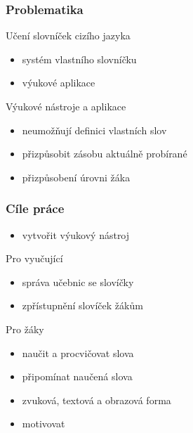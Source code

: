 \begin{frame}[t]
    \frametitle{Problematika}
    \begin{block}{Učení slovníček cizího jazyka}
    \begin{itemize}[<+->]
        \item systém vlastního slovníčku
        \item výukové aplikace
    \end{itemize}
    \end{block}
    
    \begin{block}{Výukové nástroje a aplikace}
    \begin{itemize}[<+->]
        \item neumožňují definici vlastních slov
        \item přizpůsobit zásobu aktuálně probírané
        \item přizpůsobení úrovni žáka
    \end{itemize}
    \end{block}
\end{frame}

\begin{frame}[c]
    \frametitle{Cíle práce}
    \begin{itemize}[<+->]
        \item vytvořit výukový nástroj
    \end{itemize}
    
    \begin{block}{Pro vyučující}
    \begin{itemize}[<+->]
        \item správa učebnic se slovíčky
        \item zpřístupnění slovíček žákům
    \end{itemize}
    \end{block}

    \begin{block}{Pro žáky}
        \begin{itemize}[<+->]
            \item naučit a procvičovat slova
            \item připomínat naučená slova
            \item zvuková, textová a obrazová forma
            \item motivovat
        \end{itemize}
    \end{block}
\end{frame}


